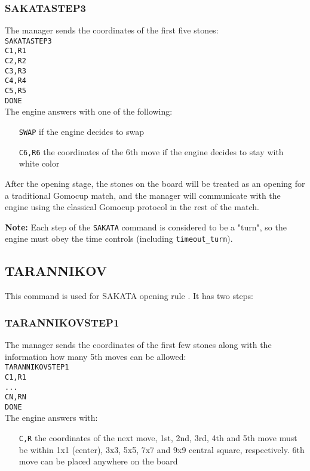 \documentclass[12pt,a4paper]{article}
\begin{document}
\subsubsection{SAKATASTEP3}
The manager sends the coordinates of the first five stones:\\
\texttt{SAKATASTEP3}\\
\texttt{C1,R1}\\
\texttt{C2,R2}\\
\texttt{C3,R3}\\
\texttt{C4,R4}\\
\texttt{C5,R5}\\
\texttt{DONE}\\
The engine answers with one of the following:
\begin{enumerate}[leftmargin=7.5em]
\item[\texttt{SWAP}]{if the engine decides to swap}
\item[\texttt{C6,R6}]{the coordinates of the 6th move if the engine decides to stay with white color}
\end{enumerate}

After the opening stage, the stones on the board will be treated as an opening for a traditional Gomocup match, and the manager will communicate with the engine using the classical Gomocup protocol in the rest of the match.

\textbf{Note:} Each step of the \texttt{SAKATA} command is considered to be a "turn", so the engine must obey the time controls (including \texttt{timeout{\_}turn}).


\subsection{TARANNIKOV}
\label{cmd_tarannikov}
This command is used for SAKATA opening rule \cite{renju_opening_rules}. It has two steps:

\subsubsection{TARANNIKOVSTEP1}
The manager sends the coordinates of the first few stones along with the information how many 5th moves can be allowed:\\
\texttt{TARANNIKOVSTEP1}\\
\texttt{C1,R1}\\
\texttt{...}\\
\texttt{CN,RN}\\
\texttt{DONE}\\
The engine answers with:
\begin{enumerate}[leftmargin=7.5em]
\item[\texttt{C,R}]{the coordinates of the next move, 1st, 2nd, 3rd, 4th and 5th move must be within 1x1 (center), 3x3, 5x5, 7x7 and 9x9 central square, respectively. 6th move can be placed anywhere on the board}
\end{enumerate}
\end{document}
